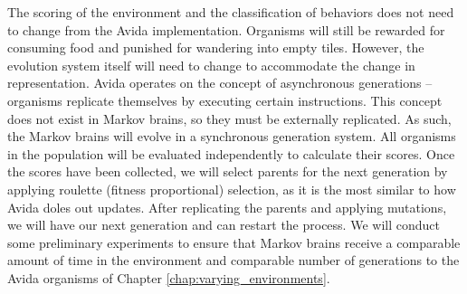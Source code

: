 The scoring of the environment and the classification of behaviors does not need to change from the Avida implementation. 
Organisms will still be rewarded for consuming food and punished for wandering into empty tiles. 
However, the evolution system itself will need to change to accommodate the change in representation. 
Avida operates on the concept of asynchronous generations -- organisms replicate themselves by executing certain instructions. 
This concept does not exist in Markov brains, so they must be externally replicated. 
As such, the Markov brains will evolve in a synchronous generation system. 
All organisms in the population will be evaluated independently to calculate their scores. 
Once the scores have been collected, we will select parents for the next generation by applying roulette (fitness proportional) selection, as it is the most similar to how Avida doles out updates. 
After replicating the parents and applying mutations, we will have our next generation and can restart the process.
We will conduct some preliminary experiments to ensure that Markov brains receive a comparable amount of time in the environment and comparable number of generations to the Avida organisms of Chapter \ref{chap:varying_environments}.

